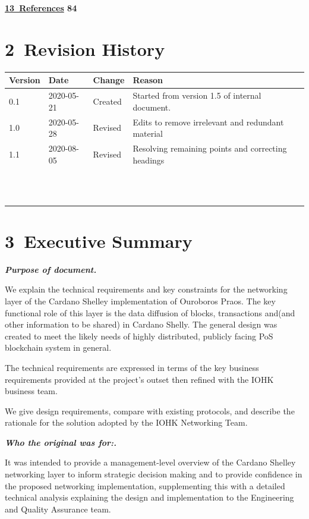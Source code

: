 \documentclass[]{article}
\begin{document}
\textbf{\protect\hyperlink{references}{​13​~References} 84}

\hypertarget{revision-history}{%
\section{​2​~Revision History}\label{revision-history}}

\begin{longtable}[]{@{}llll@{}}
\toprule
\textbf{Version} & \textbf{Date} & \textbf{Change} &
\textbf{Reason}\tabularnewline
\midrule
\endhead
0.1 & 2020-05-21 & Created & Started from version 1.5 of internal
document.\tabularnewline
1.0 & 2020-05-28 & Revised & Edits to remove irrelevant and redundant
material\tabularnewline
1.1 & 2020-08-05 & Revised & Resolving remaining points and correcting
headings\tabularnewline
& & &\tabularnewline
& & &\tabularnewline
& & &\tabularnewline
& & &\tabularnewline
& & &\tabularnewline
& & &\tabularnewline
& & &\tabularnewline
& & &\tabularnewline
& & &\tabularnewline
& & &\tabularnewline
& & &\tabularnewline
& & &\tabularnewline
\bottomrule
\end{longtable}

\hypertarget{executive-summary}{%
\section{​3​~Executive Summary}\label{executive-summary}}

\emph{\textbf{Purpose of document.} }

We explain the technical requirements and key constraints for the
networking layer of the Cardano Shelley implementation of Ouroboros
Praos. The key functional role of this layer is the data diffusion of
blocks, transactions and(and other information to be shared) in Cardano
Shelly. The general design was created to meet the likely needs of
highly distributed, publicly facing PoS blockchain system in general.

The technical requirements are expressed in terms of the key business
requirements provided at the project's outset then refined with the IOHK
business team.

We give design requirements, compare with existing protocols, and
describe the rationale for the solution adopted by the IOHK Networking
Team.

\emph{\textbf{Who the original was for:. }}

It was intended to provide a management-level overview of the Cardano
Shelley networking layer to inform strategic decision making and to
provide confidence in the proposed networking implementation,
supplementing this with a detailed technical analysis explaining the
design and implementation to the Engineering and Quality Assurance team.
\end{document}
